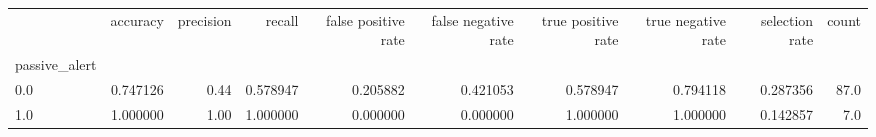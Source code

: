 \begin{tabular}{lrrrrrrrrr}
\toprule
{} &  accuracy &  precision &    recall &  false positive rate &  false negative rate &  true positive rate &  true negative rate &  selection rate &  count \\
passive\_alert &           &            &           &                      &                      &                     &                     &                 &        \\
\midrule
0.0           &  0.747126 &       0.44 &  0.578947 &             0.205882 &             0.421053 &            0.578947 &            0.794118 &        0.287356 &   87.0 \\
1.0           &  1.000000 &       1.00 &  1.000000 &             0.000000 &             0.000000 &            1.000000 &            1.000000 &        0.142857 &    7.0 \\
\bottomrule
\end{tabular}

